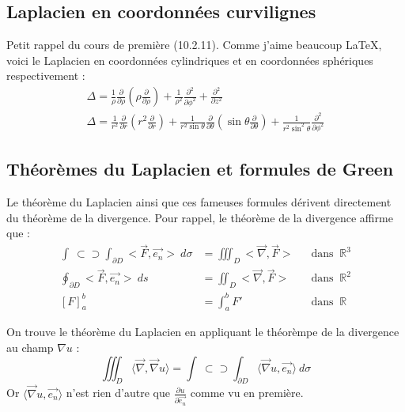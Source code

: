 \documentclass	[11pt, a4paper, openany]{book}
\newcommand{\oiint}{\int\!\!\!\!\!\!\! \:\!\subset\!\!\supset\!\!\!\!\!\!\!\int}
\begin{document}
					\subsection{Laplacien en coordonnées curvilignes}
					Petit rappel du cours de première (10.2.11). Comme j'aime beaucoup \LaTeX, voici le Laplacien
					en coordonnées cylindriques et en coordonnées sphériques respectivement :
					\begin{eqnarray}
						\Delta = \frac{1}{\rho}\frac{\partial}{\partial\rho}\left(\rho\frac{\partial}{\partial\rho}\right)
						+\frac{1}{\rho^2}\frac{\partial^2}{\partial\phi^2}+ \frac{\partial^2}{\partial z^2}\\
						\Delta = \frac{1}{r^2}\frac{\partial}{\partial r}\left(r^2\frac{\partial}{\partial r}\right) +
						\frac{1}{r^2\sin\theta}\frac{\partial}{\partial\theta}\left(\sin\theta\frac{\partial}{\partial
							\theta}\right) + \frac{1}{r^2\sin^2\theta}\frac{\partial^2}{\partial\phi^2}
					\end{eqnarray}
						
					\subsection{Théorèmes du Laplacien et formules de Green}
					Le théorème du Laplacien ainsi que ces fameuses formules dérivent directement du théorème de
					la divergence. Pour rappel, le théorème de la divergence affirme que :
					\begin{equation}
						\begin{array}{lll}
							\oiint_{\partial D} <\vec{F},\vec{e_n}>\ d\sigma & = \iiint_D <\vec{\nabla},\vec{F}> & \ \ \text{                    
							dans }\ \mathbb{R}^3\\
							\oint_{\partial D}  <\vec{F},\vec{e_n}>\ ds      & = \iint_D <\vec{\nabla},\vec{F}>  & \ \ \text{                    
							dans }\ \mathbb{R}^2\\
							\left[F\right]^b_a                               & = \int_a^b F'                     & \ \ \text{ dans }\ \mathbb{R} 
						\end{array}
					\end{equation}
						
					On trouve le théorème du Laplacien en appliquant le théorèmpe de la divergence au champ 
					$\nabla u$ :
					\begin{equation}
						\iiint_D \langle\vec{\nabla},\vec{\nabla}u\rangle = \oiint_{\partial D} \langle\vec{\nabla}
						u, \vec{e_n}\rangle\ d\sigma
					\end{equation}
					Or $\langle\vec{\nabla}	u, \vec{e_n}\rangle$ n'est rien d'autre que $\frac{\partial u}{\partial
						\vec{e_n}}$ comme vu en première.\\
						 
\end{document}
